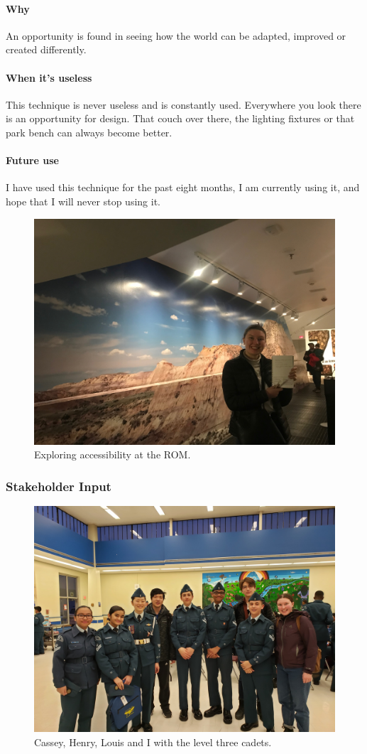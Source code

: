 \documentclass[paper=a4, fontsize=11pt]{article} %
\begin{document}
            \paragraph{Why}
            An opportunity is found in seeing how the world can be adapted, improved or created differently.
            \paragraph{When it's useless}
            This technique is never useless and is constantly used. Everywhere you look there is an opportunity for design. That couch over there, the lighting fixtures or that park bench can always become better.
            \paragraph{Future use}
            I have used this technique for the past eight months, I am currently using it, and hope that I will  never stop using it.
            \begin{figure}[H]
                \centering
	            \includegraphics[width=0.6\linewidth]{rom.jpeg}
	            \caption{Exploring accessibility at the ROM.}
            \end{figure}
        \subsubsection{Stakeholder Input}
            \begin{figure}[H]
                \centering
	            \includegraphics[width=0.6\linewidth]{cadets.jpg}
	            \caption{Cassey, Henry, Louis and I with the level three cadets.}
            \end{figure}
\end{document}
